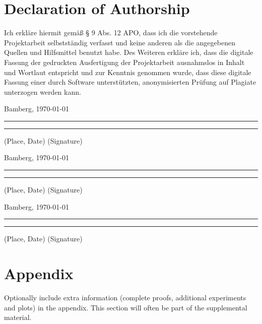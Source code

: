 \documentclass[a4paper]{article}
\begin{document}
{\parindent 0cm
\section*{Declaration of Authorship}
Ich erkläre hiermit gemäß § 9 Abs. 12 APO, dass ich die vorstehende Projektarbeit selbstständig verfasst und keine anderen als die angegebenen Quellen und Hilfsmittel benutzt habe. Des Weiteren erkläre ich, dass die digitale Fassung der gedruckten Ausfertigung der Projektarbeit ausnahmslos in Inhalt und Wortlaut entspricht und zur Kenntnis genommen wurde, dass diese digitale Fassung einer durch Software unterstützten, anonymisierten Prüfung auf Plagiate unterzogen werden kann.\\
\vspace{2\baselineskip}
  
Bamberg, \today

\rule[0.5em]{14em}{0.5pt} \hspace{0.25\linewidth}\rule[0.5em]{14em}{0.5pt}
\vspace{1em}
\hspace{4em} (Place, Date) \hspace{0.51\linewidth} (Signature)

Bamberg, \today

\rule[0.5em]{14em}{0.5pt} \hspace{0.25\linewidth}\rule[0.5em]{14em}{0.5pt}
\vspace{1em}
\hspace{4em} (Place, Date) \hspace{0.51\linewidth} (Signature)

Bamberg, \today

\rule[0.5em]{14em}{0.5pt} \hspace{0.25\linewidth}\rule[0.5em]{14em}{0.5pt}
\vspace{1em}
\hspace{4em} (Place, Date) \hspace{0.51\linewidth} (Signature)
}







\appendix


\section{Appendix}


Optionally include extra information (complete proofs, additional experiments and plots) in the appendix.
This section will often be part of the supplemental material.
\end{document}

